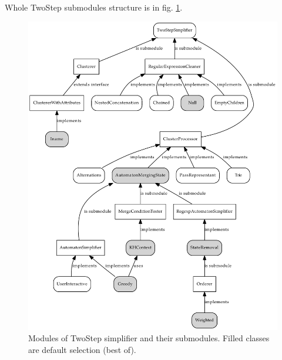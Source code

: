 \documentclass[a4paper,10pt,oneside]{article}
\begin{document}
Whole TwoStep submodules structure is in fig. \ref{twostep_modules_complete}.
\begin{figure}[tpb]
	\centering\includegraphics[scale=0.37]{twostep_modules_complete}
	\caption{Modules of TwoStep simplifier and their submodules. Filled classes are default selection (best of).} \label{twostep_modules_complete}
\end{figure}

\nocite{*}
\newpage


\end{document}
